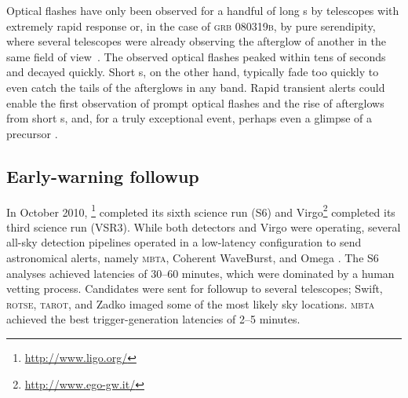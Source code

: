 Optical flashes have only been observed for a handful of long \GRB{}s
\citep{2011CRPhy..12..255A} by telescopes with extremely rapid response or, in
the case of \textsc{grb 080319b}, by pure serendipity, where several telescopes
were already observing the afterglow of another \GRB{} in the same field of
view~\citep{2008Natur.455..183R}. The observed optical flashes peaked within
tens of seconds and decayed quickly.  Short \GRB{}s, on the other hand,
typically fade too quickly to even catch the tails of the afterglows in any
band. Rapid \GW{} transient alerts could enable the first observation of prompt
optical flashes and the rise of afterglows from short \GRB{}s, and, for a truly
exceptional event, perhaps even a glimpse of a precursor
\citep{0004-637X-723-2-1711}.

\subsection{Early-warning \EM{} followup}

In October 2010, \LIGO{}\footnote{\url{http://www.ligo.org/}} completed its
sixth science run (S6) and Virgo\footnote{\url{http://www.ego-gw.it/}}
completed its third science run (VSR3).  While both \LIGO{} detectors and Virgo
were operating, several all-sky detection pipelines operated in a low-latency
configuration to send astronomical alerts, namely \textsc{mbta}, Coherent
WaveBurst, and Omega \citep{HugheyGWPAW2011, S6lowlatency}. The S6 analyses
achieved latencies of 30--60 minutes, which were dominated by a human vetting
process. Candidates were sent for \EM{} followup to several telescopes; Swift,
\textsc{rotse}, \textsc{tarot}, and Zadko \citep{kanner2008, HugheyGWPAW2011}
imaged some of the most likely sky locations.  \textsc{mbta} achieved the best
\GW{} trigger-generation latencies of 2--5 minutes.  

